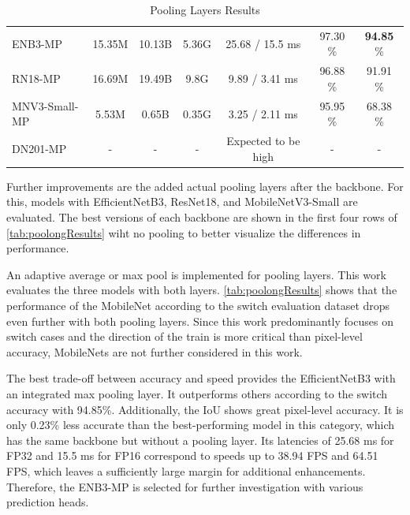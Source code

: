 \begin{table}[H]
{\begin{minipage}{0.95\textwidth}
\begin{tabular}{lcccccc}
            \hline
            \rowcolor[gray]{0.9} ENB3-MP       & 15.35M            & 10.13B         & 5.36G          & 25.68 / 15.5 ms         & 97.30 \%          & \textbf{94.85} \% \\ 
            \rowcolor{white}     RN18-MP       & 16.69M            & 19.49B         & 9.8G           & 9.89 / 3.41 ms          & 96.88 \%          & 91.91 \% \\ 
            \rowcolor[gray]{0.9} MNV3-Small-MP & 5.53M             & 0.65B          & 0.35G          & 3.25 / 2.11 ms          & 95.95 \%          & 68.38 \% \\ 
            \rowcolor{white}     DN201-MP      & -                 & -              & -              & Expected to be high     & -                 & - \\ 
            \hline
        \end{tabular}
    \end{minipage}
    }
    \caption{Pooling Layers Results}
    \label{tab:poolongResults}
\end{table}

Further improvements are the added actual pooling layers after the backbone.
For this, models with EfficientNetB3, ResNet18, and MobileNetV3-Small are evaluated.
The best versions of each backbone are shown in the first four rows of \autoref{tab:poolongResults} wiht no pooling to better visualize the differences in performance.

An adaptive average or max pool is implemented for pooling layers.
This work evaluates the three models with both layers.
\autoref{tab:poolongResults} shows that the performance of the MobileNet according to the switch evaluation dataset drops even further with both pooling layers.
Since this work predominantly focuses on switch cases and the direction of the train is more critical than pixel-level accuracy, MobileNets are not further considered in this work.

The best trade-off between accuracy and speed provides the EfficientNetB3 with an integrated max pooling layer.
It outperforms others according to the switch accuracy with 94.85\%.
Additionally, the \ac{IoU} shows great pixel-level accuracy.
It is only 0.23\% less accurate than the best-performing model in this category, which has the same backbone but without a pooling layer.
Its latencies of 25.68 ms for FP32 and 15.5 ms for FP16 correspond to speeds up to 38.94 \ac{FPS} and 64.51 \ac{FPS}, which leaves a sufficiently large margin for additional enhancements.
Therefore, the ENB3-MP is selected for further investigation with various prediction heads.

